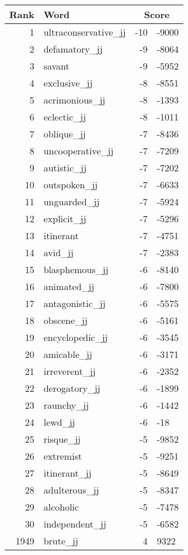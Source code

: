 \begin{longtable}[!htbp]{| rlr@{.}l |}
    \hline
    \textbf{Rank} & \textbf{Word} & \multicolumn{2}{c|}{\textbf{Score}} \\
    \hline
    \endhead
    1 & ultraconservative\_jj & -10 & -9000 \\
    2 & defamatory\_jj & -9 & -8064 \\
    3 & savant & -9 & -5952 \\
    4 & exclusive\_jj & -8 & -8551 \\
    5 & acrimonious\_jj & -8 & -1393 \\
    6 & eclectic\_jj & -8 & -1011 \\
    7 & oblique\_jj & -7 & -8436 \\
    8 & uncooperative\_jj & -7 & -7209 \\
    9 & autistic\_jj & -7 & -7202 \\
    10 & outspoken\_jj & -7 & -6633 \\
    11 & unguarded\_jj & -7 & -5924 \\
    12 & explicit\_jj & -7 & -5296 \\
    13 & itinerant & -7 & -4751 \\
    14 & avid\_jj & -7 & -2383 \\
    15 & blasphemous\_jj & -6 & -8140 \\
    16 & animated\_jj & -6 & -7800 \\
    17 & antagonistic\_jj & -6 & -5575 \\
    18 & obscene\_jj & -6 & -5161 \\
    19 & encyclopedic\_jj & -6 & -3545 \\
    20 & amicable\_jj & -6 & -3171 \\
    21 & irreverent\_jj & -6 & -2352 \\
    22 & derogatory\_jj & -6 & -1899 \\
    23 & raunchy\_jj & -6 & -1442 \\
    24 & lewd\_jj & -6 & -18 \\
    25 & risque\_jj & -5 & -9852 \\
    26 & extremist & -5 & -9251 \\
    27 & itinerant\_jj & -5 & -8649 \\
    28 & adulterous\_jj & -5 & -8347 \\
    29 & alcoholic & -5 & -7478 \\
    30 & independent\_jj & -5 & -6582 \\
    1949 & brute\_jj & 4 & 9322 \\

\end{longtable}
